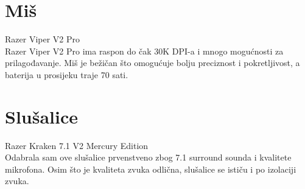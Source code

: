 \documentclass{report}
\begin{document}
\chapter{Miš}
Razer Viper V2 Pro
\\Razer Viper V2 Pro ima raspon do čak 30K DPI-a i mnogo mogućnosti za prilagođavanje. Miš je bežičan što omogućuje bolju preciznost i pokretljivost, a baterija u prosijeku traje 70 sati.

\chapter{Slušalice}
Razer Kraken 7.1 V2 Mercury Edition
\\Odabrala sam ove slušalice prvenstveno zbog 7.1 surround sounda i kvalitete mikrofona. Osim što je kvaliteta zvuka odlična, slušalice se ističu i po izolaciji zvuka.
\end{document}
